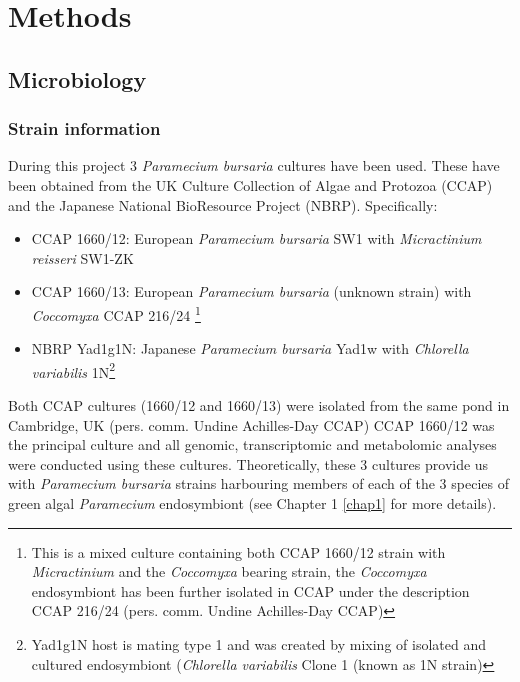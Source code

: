 \graphicspath{{chapters/2.Methods/figures/}}



\chapter{Methods}

\section{Microbiology}
\subsection{Strain information}
During this project 3 \textit{Paramecium bursaria} cultures have been used.  These have been obtained from 
the UK Culture Collection of Algae and Protozoa (CCAP) and the Japanese National BioResource Project (NBRP).
Specifically:
\begin{itemize}
    \item CCAP 1660/12: European \textit{Paramecium bursaria} SW1 with \textit{Micractinium reisseri} SW1-ZK \citep{Hoshina2010}
    \item CCAP 1660/13: European \textit{Paramecium bursaria} (unknown strain) with \textit{Coccomyxa} CCAP 216/24 \footnote{This is a mixed culture 
            containing both CCAP 1660/12 strain with \textit{Micractinium} and the \textit{Coccomyxa} bearing strain, 
        the \textit{Coccomyxa} endosymbiont has been further isolated in CCAP under the description CCAP 216/24 (pers. comm. Undine Achilles-Day CCAP)}
    \item NBRP Yad1g1N: Japanese \textit{Paramecium bursaria} Yad1w with \textit{Chlorella variabilis} 1N\footnote{
        Yad1g1N host is mating type 1 and was created by mixing of isolated and 
        cultured endosymbiont (\textit{Chlorella variabilis} Clone 1 (known as 1N strain)
        }
\end{itemize}

Both CCAP cultures (1660/12 and 1660/13) were isolated from the same pond in Cambridge, UK (pers. comm. Undine Achilles-Day CCAP)
CCAP 1660/12 was the principal culture and all genomic, transcriptomic and metabolomic analyses were conducted using these cultures. 
Theoretically, these 3 cultures provide us with \textit{Paramecium bursaria} strains harbouring members of each of the 3 species of 
green algal \textit{Paramecium} endosymbiont (see Chapter 1 \ref{chap1} for more details).

